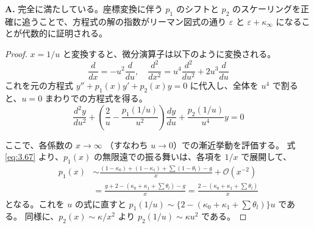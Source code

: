 \begin{Q}[【計算の検証】$x \to \infty$ における $p_2(x) \sim \kappa/x^2$ という振る舞いは、座標変換 $x=1/u$ を経た後の $u=0$ での決定方程式を正しく満たしているか？]
\textbf{A.} 完全に満たしている。座標変換に伴う $p_1$ のシフトと $p_2$ のスケーリングを正確に追うことで、方程式の解の指数がリーマン図式の通り $\varepsilon$ と $\varepsilon+\kappa_\infty$ になることが代数的に証明される。

\begin{proof}
$x = 1/u$ と変換すると、微分演算子は以下のように変換される。
\begin{equation*}
\frac{d}{dx} = -u^2 \frac{d}{du}, \quad \frac{d^2}{dx^2} = u^4 \frac{d^2}{du^2} + 2u^3 \frac{d}{du}
\end{equation*}
これを元の方程式 $y'' + p_1(x)y' + p_2(x)y = 0$ に代入し、全体を $u^4$ で割ると、$u=0$ まわりでの方程式を得る。
\begin{equation}
\frac{d^2y}{du^2} + \left( \frac{2}{u} - \frac{p_1(1/u)}{u^2} \right) \frac{dy}{du} + \frac{p_2(1/u)}{u^4} y = 0 \label{eq:u_eq}
\end{equation}

ここで、各係数の $x \to \infty$ （すなわち $u \to 0$）での漸近挙動を評価する。
式 \eqref{eq:3.67} より、$p_1(x)$ の無限遠での振る舞いは、各項を $1/x$ で展開して、
\begin{align*}
p_1(x) &\sim \frac{(1-\kappa_0) + (1-\kappa_1) + \sum (1-\theta_l) - g}{x} + \mathcal{O}(x^{-2}) \\
&= \frac{g + 2 - (\kappa_0 + \kappa_1 + \sum \theta_l) - g}{x} = \frac{2 - (\kappa_0 + \kappa_1 + \sum \theta_l)}{x}
\end{align*}
となる。これを $u$ の式に直すと $p_1(1/u) \sim \{2 - (\kappa_0 + \kappa_1 + \sum \theta_l)\}u$ である。
同様に、$p_2(x) \sim \kappa/x^2$ より $p_2(1/u) \sim \kappa u^2$ である。


\end{proof}
\end{Q}
